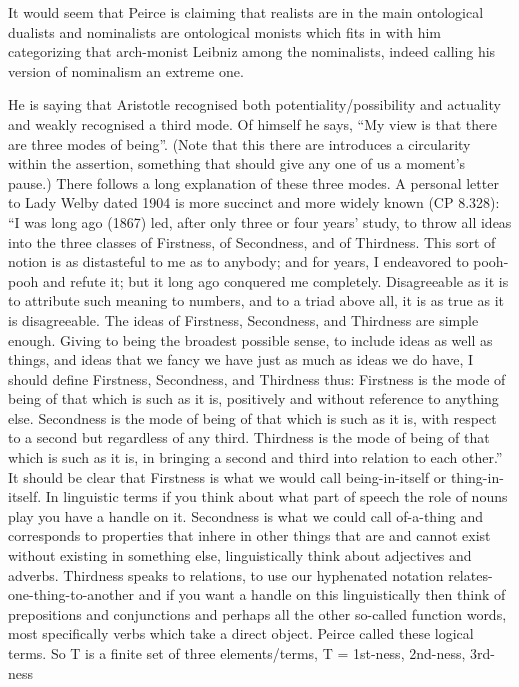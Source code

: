 \documentclass[dah,phd,a4paper]{xe_uccthesis}
\begin{document}
	It would seem that Peirce is claiming that realists are in the main ontological dualists and nominalists are ontological monists which fits in with him categorizing that arch-monist Leibniz among the nominalists, indeed calling his version of nominalism an extreme one.

	He is saying that Aristotle recognised both potentiality/possibility and actuality and weakly recognised a third mode. Of himself he says, “My view is that there are three modes of being”. (Note that this there are introduces a circularity within the assertion, something that should give any one of us a moment's pause.) There follows a long explanation of these three modes. A personal letter to Lady Welby dated 1904 is more succinct and more widely known (CP 8.328):
“I was long ago (1867) led, after only three or four years’ study, to throw all ideas into the three classes of Firstness, of Secondness, and of Thirdness. This sort of notion is as distasteful to me as to anybody; and for years, I endeavored to pooh-pooh and refute it; but it long ago conquered me completely. Disagreeable as it is to attribute such meaning to numbers, and to a triad above all, it is as true as it is disagreeable. The ideas of Firstness, Secondness, and Thirdness are simple enough. Giving to being the broadest possible sense, to include ideas as well as things, and ideas that we fancy we have just as much as ideas we do have, I should define Firstness, Secondness, and Thirdness thus:
Firstness is the mode of being of that which is such as it is, positively and without reference to anything else.
Secondness is the mode of being of that which is such as it is, with respect to a second but regardless of any third.
Thirdness is the mode of being of that which is such as it is, in bringing a second and third into relation to each other.”
	It should be clear that Firstness is what we would call being-in-itself or thing-in-itself. In linguistic terms if you think about what part of speech the role of nouns play you have a handle on it. Secondness is what we could call of-a-thing and corresponds to properties that inhere in other things that are and cannot exist without existing in something else, linguistically think about adjectives and adverbs. Thirdness speaks to relations, to use our hyphenated notation relates-one-thing-to-another and if you want a handle on this linguistically then think of prepositions and conjunctions and perhaps all the other so-called function words, most specifically verbs which take a direct object. Peirce called these logical terms. So T is a finite set of three elements/terms, T = {1st-ness, 2nd-ness, 3rd-ness}
\end{document}
